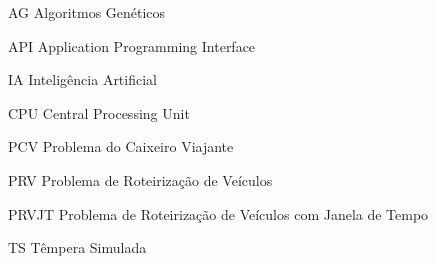 \documentclass[
	12pt,				%
	openright,			%
	oneside,
	a4paper,			%
	english,			%
	french,				%
	spanish,			%
	brazil				%
	]{abntex2}
\begin{document}
\frenchspacing 


\imprimircapa

\imprimirfolhaderosto%


\setlength{\absparsep}{18pt} %

   



\begin{siglas}
  \item[AG] Algoritmos Genéticos
  \item[API] Application Programming Interface
  \item[IA] Inteligência Artificial
  \item[CPU] Central Processing Unit
  \item[PCV] Problema do Caixeiro Viajante
  \item[PRV] Problema de Roteirização de Veículos
  \item[PRVJT] Problema de Roteirização de Veículos com Janela de Tempo
  \item[TS] Têmpera Simulada
\end{siglas}

\tableofcontents*
\cleardoublepage

\textual


\end{document}
